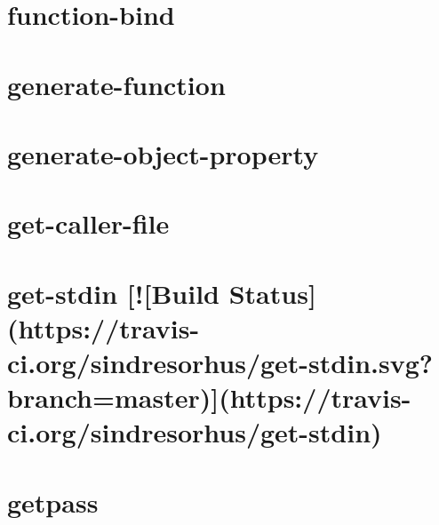 \documentclass[twoside]{book}
\newcommand{\+}{\discretionary{\mbox{\scriptsize$\hookleftarrow$}}{}{}}
\begin{document}
\chapter{function-\/bind}
\label{md__c_1_workspace_demo_src_main_script_node_modules_function-bind__r_e_a_d_m_e}

\chapter{generate-\/function}
\label{md__c_1_workspace_demo_src_main_script_node_modules_generate-function__r_e_a_d_m_e}

\chapter{generate-\/object-\/property}
\label{md__c_1_workspace_demo_src_main_script_node_modules_generate-object-property__r_e_a_d_m_e}

\chapter{get-\/caller-\/file}
\label{md__c_1_workspace_demo_src_main_script_node_modules_get-caller-file__r_e_a_d_m_e}

\chapter{get-\/stdin \mbox{[}!\mbox{[}Build Status\mbox{]}(https\+://travis-\/ci.org/sindresorhus/get-\/stdin.svg?branch=master)\mbox{]}(https\+://travis-\/ci.org/sindresorhus/get-\/stdin)}
\label{md__c_1_workspace_demo_src_main_script_node_modules_get-stdin_readme}

\chapter{getpass}
\label{md__c_1_workspace_demo_src_main_script_node_modules_getpass__r_e_a_d_m_e}

\end{document}
